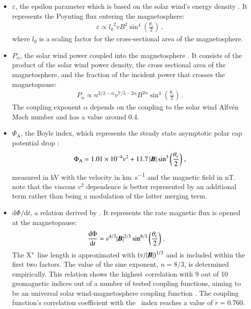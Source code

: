 \begin{itemize}
	\item $\varepsilon$, the epsilon parameter which is based on the solar wind's energy density \citep{Perreault1978}. It represents the Poynting flux entering the magnetosphere:
	\begin{align}
		\varepsilon \propto {l_0}^2 v B^2 \sin^4\left(\frac{\theta_c}{2}\right)	\,,
	\end{align}
	where $l_0$ is a scaling factor for the cross-sectional area of the magnetosphere.
	
	\item $P_\alpha$, the solar wind power coupled into the magnetosphere \citep{Stamper1999,Lockwood2013}. It consists of the product of the solar wind power density, the cross sectional area of the magnetosphere, and the fraction of the incident power that crosses the magnetopause:
	\begin{align}
		P_\alpha \propto n^{2/3 - \alpha} v^{7/3 - 2 \alpha} B^{2 \alpha} \sin^4\left(\frac{\theta_c}{2}\right)	\,.
	\end{align}
	The coupling exponent $\alpha$ depends on the coupling to the solar wind Alfvén Mach number and has a value around 0.4.

	\item $\Phi_\text{A}$, the Boyle index, which represents the steady state asymptotic polar cap potential drop \citep{Boyle1997}:
	\begin{align}
		\Phi_\text{A} = \num{1.01e-4} v^2 + 11.7\,|\boldsymbol{B}| \sin^{3}\left(\frac{\theta_c}{2}\right)	\,,
	\end{align}
	measured in \si{\kilo\volt} with the velocity in \si{\km\per\s} and the magnetic field in \si{\nano\tesla}. \citet{Boyle1997} note that the viscous $v^2$ dependence is better represented by an additional term rather than being a modulation of the latter merging term.
	
	\pagebreak
	
	\item $\text{d}\Phi / \text{d}t$, a relation derived by \citet{Newell2007}. It represents the rate magnetic flux is opened at the magnetopause:
	\begin{align}
		\frac{\text{d}\Phi}{\text{d}t} &= v^{4/3} |\boldsymbol{B}|^{2/3} \sin^{8/3}\left(\frac{\theta_c}{2}\right)	\,.	\label{eq:newell_merging_function}
	\end{align}
	The X"~line length is approximated with $\left(v / |\boldsymbol{B}|\right)^{1/3}$ and is included within the first two factors. The value of the sine exponent, $n = 8/3$, is determined empirically. This relation shows the highest correlation with 9 out of 10 geomagnetic indices out of a number of tested coupling functions, aiming to be an universal solar wind-magnetosphere coupling function \citep{Newell2007}. The coupling function's correlation coefficient with the \Kp~index reaches a value of $r = 0.760$.
	

\end{itemize}
